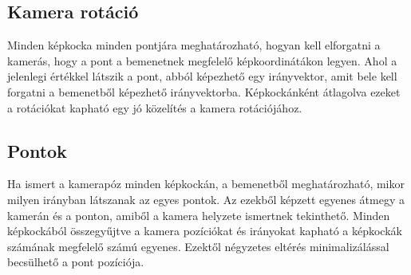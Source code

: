 \documentclass{article}
\begin{document}
\subsection{Kamera rotáció}
Minden képkocka minden pontjára meghatározható, hogyan kell elforgatni a kamerás, hogy a pont a bemenetnek megfelelő képkoordinátákon legyen. Ahol a jelenlegi értékkel látszik a pont, abból képezhető egy irányvektor, amit bele kell forgatni a bemenetből képezhető irányvektorba.
Képkockánként átlagolva ezeket a rotációkat kapható egy jó közelítés a kamera rotációjához.

\subsection{Pontok}
Ha ismert a kamerapóz minden képkockán, a bemenetből meghatározható, mikor milyen irányban látszanak az egyes pontok. Az ezekből képzett egyenes átmegy a kamerán és a ponton, amiből a kamera helyzete ismertnek tekinthető. Minden képkockából összegyűjtve a kamera pozíciókat és irányokat kapható a képkockák számának megfelelő számú egyenes. Ezektől négyzetes eltérés minimalizálással becsülhető a pont pozíciója.
	
\end{document}
